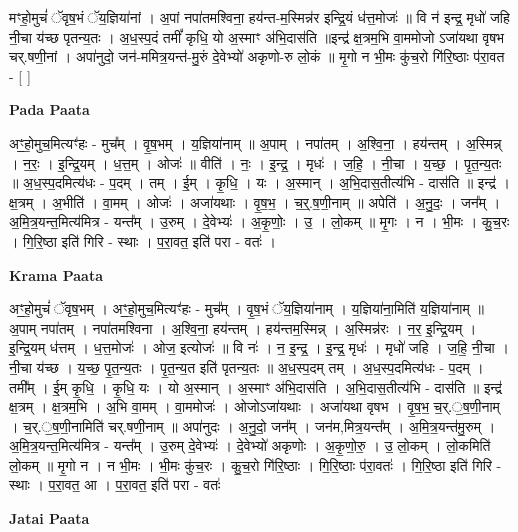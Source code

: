 \documentclass[17pt]{extarticle}
\begin{document}
मꣳहो॒मुचं॑ ॅवृष॒भं ॅय॒ज्ञिया॑नां । अ॒पां नपा॑तमश्विना॒ हय॑न्त-म॒स्मिन्न॑र इन्द्रि॒यं ध॑त्त॒मोजः॑ ॥ वि न॑ इन्द्र॒ मृधो॑ जहि नी॒चा य॑च्छ पृतन्य॒तः । अ॒ध॒स्प॒दं तमीं᳚ कृधि॒ यो अ॒स्माꣳ अ॑भि॒दास॑ति ॥इन्द्र॑ क्ष॒त्रम॒भि वा॒ममोजो ऽजा॑यथा वृषभ चर्.षणी॒नां । अपा॑नुदो॒ जन॑-ममित्र॒यन्त॑-मु॒रुं दे॒वेभ्यो॑ अकृणो-रु लो॒कं ॥ मृ॒गो न भी॒मः कु॑च॒रो गि॑रि॒ष्ठाः प॑रा॒वत - [ ] \newline

\textbf{Pada Paata} \newline

अꣳ॒॒हो॒मुच॒मित्यꣳ॑हः - मुच᳚म् । वृ॒ष॒भम् । य॒ज्ञिया॑नाम् ॥ अ॒पाम् । नपा॑तम् । अ॒श्वि॒ना॒ । हय॑न्तम् । अ॒स्मिन्न् । न॒रः॒ । इ॒न्द्रि॒यम् । ध॒त्त॒म् । ओजः॑ ॥ वीति॑ । नः॒ । इ॒न्द्र॒ । मृधः॑ । ज॒हि॒ । नी॒चा । य॒च्छ॒ । पृ॒त॒न्य॒तः ॥ अ॒ध॒स्प॒दमित्य॑धः - प॒दम् । तम् । ई॒म् । कृ॒धि॒ । यः । अ॒स्मान् । अ॒भि॒दास॒तीत्य॑भि - दास॑ति ॥ इन्द्र॑ । क्ष॒त्रम् । अ॒भीति॑ । वा॒मम् । ओजः॑ । अजा॑यथाः । वृ॒ष॒भ॒ । च॒र्॒.ष॒णी॒नाम् ॥ अपेति॑ । अ॒नु॒दः॒ । जन᳚म् । अ॒मि॒त्र॒यन्त॒मित्य॑मित्र - यन्त᳚म् । उ॒रुम् । दे॒वेभ्यः॑ । अ॒कृ॒णोः॒ । उ॒ । लो॒कम् ॥ मृ॒गः । न । भी॒मः । कु॒च॒रः । गि॒रि॒ष्ठा इति॑ गिरि - स्थाः । प॒रा॒वत॒ इति॑ परा - वतः॑ ।  \newline


\textbf{Krama Paata} \newline

अꣳ॒॒हो॒मुचं॑ ॅवृष॒भम् । अꣳ॒॒हो॒मुच॒मित्यꣳ॑हः - मुच᳚म् । वृ॒ष॒भं ॅय॒ज्ञिया॑नाम् । य॒ज्ञिया॑ना॒मिति॑ य॒ज्ञिया॑नाम् ॥ अ॒पाम् नपा॑तम् । नपा॑तमश्विना । अ॒श्वि॒ना॒ हय॑न्तम् । हय॑न्तम॒स्मिन्न् । अ॒स्मिन्न॑रः । न॒र॒ इ॒न्द्रि॒यम् । इ॒न्द्रि॒यम् ध॑त्तम् । ध॒त्त॒मोजः॑ । ओज॒ इत्योजः॑ ॥ वि नः॑ । न॒ इ॒न्द्र॒ । इ॒न्द्र॒ मृधः॑ । मृधो॑ जहि । ज॒हि॒ नी॒चा । नी॒चा य॑च्छ । य॒च्छ॒ पृ॒त॒न्य॒तः । पृ॒त॒न्य॒त इति॑ पृतन्य॒तः ॥ अ॒ध॒स्प॒दम् तम् । अ॒ध॒स्प॒दमित्य॑धः - प॒दम् । तमी᳚म् । ई॒म् कृ॒धि॒ । कृ॒धि॒ यः । यो अ॒स्मान् । अ॒स्माꣳ अ॑भि॒दास॑ति । अ॒भि॒दास॒तीत्य॑भि - दास॑ति ॥ इन्द्र॑ क्ष॒त्रम् । क्ष॒त्रम॒भि । अ॒भि वा॒मम् । वा॒ममोजः॑ । ओजोऽजा॑यथाः । अजा॑यथा वृषभ । वृ॒ष॒भ॒ च॒र्.॒ष॒णी॒नाम् । च॒र्.॒ष॒णी॒नामिति॑ चर्.षणी॒नाम् ॥ अपा॑नुदः । अ॒नु॒दो॒ जन᳚म् । जन॑म,मित्र॒यन्त᳚म् । अ॒मि॒त्र॒यन्त॑मु॒रुम् । अ॒मि॒त्र॒यन्त॒मित्य॑मित्र - यन्त᳚म् । उ॒रुम् दे॒वेभ्यः॑ । दे॒वेभ्यो॑ अकृणोः । अ॒कृ॒णो॒रु॒ । उ॒ लो॒कम् । लो॒कमिति॑ लो॒कम् ॥ मृ॒गो न । न भी॒मः । भी॒मः कु॑च॒रः । कु॒च॒रो गि॑रि॒ष्ठाः । गि॒रि॒ष्ठाः प॑रा॒वतः॑ । गि॒रि॒ष्ठा इति॑ गिरि - स्थाः । प॒रा॒वत॒ आ । प॒रा॒वत॒ इति॑ परा - वतः॑ \newline

\textbf{Jatai Paata} \newline
\end{document}
